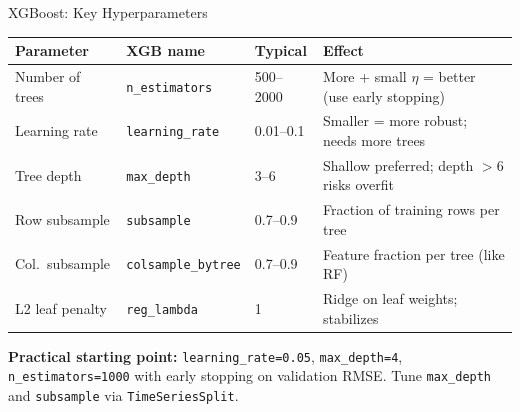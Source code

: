 \documentclass[aspectratio=169, 11pt]{beamer}
\begin{document}
\begin{frame}{XGBoost: Key Hyperparameters}
  \begin{center}
    {\footnotesize
    \begin{tabular}{p{2.6cm}p{2.8cm}p{1.8cm}p{4.0cm}}
      \toprule
      \textbf{Parameter} & \textbf{XGB name} & \textbf{Typical} & \textbf{Effect} \\
      \midrule
      Number of trees & \texttt{n\_estimators} & 500--2000 & More + small $\eta$ = better (use early stopping) \\
      Learning rate & \texttt{learning\_rate} & 0.01--0.1 & Smaller = more robust; needs more trees \\
      Tree depth & \texttt{max\_depth} & 3--6 & Shallow preferred; depth $>$6 risks overfit \\
      Row subsample & \texttt{subsample} & 0.7--0.9 & Fraction of training rows per tree \\
      Col.\ subsample & \texttt{colsample\_bytree} & 0.7--0.9 & Feature fraction per tree (like RF) \\
      L2 leaf penalty & \texttt{reg\_lambda} & 1 & Ridge on leaf weights; stabilizes \\
      \bottomrule
    \end{tabular}
    }
  \end{center}
  \begin{keybox}
    \small \textbf{Practical starting point:}
    \texttt{learning\_rate=0.05}, \texttt{max\_depth=4},
    \texttt{n\_estimators=1000} with early stopping on validation RMSE.
    Tune \texttt{max\_depth} and \texttt{subsample} via \texttt{TimeSeriesSplit}.
  \end{keybox}
\end{frame}
\end{document}
